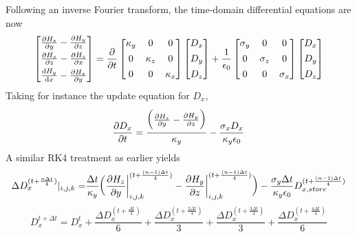 \documentclass[]{article}
\begin{document}
		Following an inverse Fourier transform, the time-domain differential equations are now
		\begin{equation}
			\begin{bmatrix}
				\pdv{H_{z}}{y} - \pdv{H_{y}}{z} \\[4pt]
				\pdv{H_{x}}{z} - \pdv{H_{z}}{x} \\[4pt]
				\dv{H_{y}}{x} - \pdv{H_{x}}{y}
			\end{bmatrix}
			 = \pdv{}{t}
			 \begin{bmatrix}
			 	\kappa_{y} & 0 & 0 \\[4pt]
			 	0 & \kappa_{z} & 0 \\[4pt] 
			 	0 & 0 & \kappa_{x}
			 \end{bmatrix}
			 \begin{bmatrix}
			 	D_{x}\\[4pt]
			 	D_{y}\\[4pt]
			 	D_{z}
			 \end{bmatrix}
			 + \frac{1}{\epsilon_{0}}
			 \begin{bmatrix}
			 	\sigma_{y} & 0 & 0 \\[4pt]
			 	0 & \sigma_{z} & 0 \\[4pt] 
			 	0 & 0 & \sigma_{x}
			 \end{bmatrix}
			 \begin{bmatrix}
			 	D_{x}\\[4pt]
			 	D_{y}\\[4pt]
			 	D_{z}
			 \end{bmatrix}
		\end{equation}
		Taking for instance the update equation for $D_{x}$,
		\begin{equation}
			\pdv{D_{x}}{t} = \frac{\bigg(\pdv{H_{z}}{y} - \pdv{H_{y}}{z}\bigg)}{\kappa_{y}} - \frac{\sigma_{x}D_{x}}{\kappa_{y}\epsilon_{0}}
		\end{equation}
		A similar RK4 treatment as earlier yields 
		\begin{align*}
			\Delta D_{x}^{(t+\frac{n\Delta t}{4})}|_{i, j, k} = 
			& \frac{\Delta t}{\kappa_{y}}\bigg(\pdv{H_{z}}{y}\bigg|^{(t + \frac{(n-1)\Delta t}{4})}_{i, j, k} - \pdv{H_{y}}{z}\bigg|^{(t + \frac{(n-1)\Delta t}{4})}_{i, j, k}\bigg) - \frac{\sigma_{y}\Delta t}{\kappa_{y}\epsilon_{0}}D_{x, store}^{(t + \frac{(n-1)\Delta t}{4})}\\
		\end{align*}
		\begin{equation}
			D_{x}^{t + \Delta t} = D_{x}^{t} + \frac{\Delta D_{x}^{(t+\frac{\Delta t}{4})}}{6} + \frac{\Delta D_{x}^{(t+\frac{2\Delta t}{4})}}{3} + \frac{\Delta D_{x}^{(t+\frac{3\Delta t}{4})}}{3} + \frac{\Delta D_{x}^{(t+\frac{4\Delta t}{4})}}{6}
		\end{equation}
		
\end{document}
